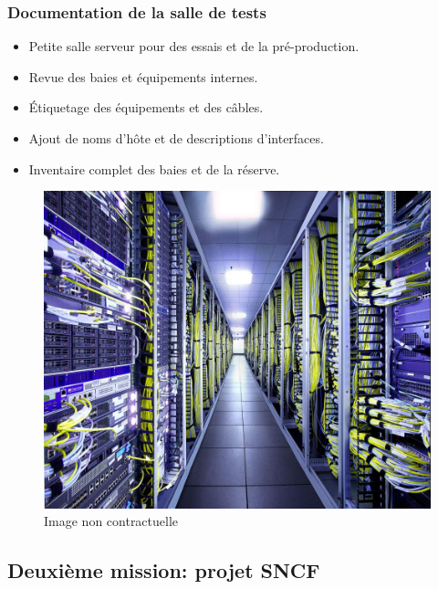 \documentclass[french, a4paper]{beamer}
\begin{document}
\begin{frame}
    \frametitle{Documentation de la salle de tests}
    \begin{minipage}{0.5\textwidth}
        \begin{itemize}
            \item Petite salle serveur pour des essais et de la pré-production.
            \item Revue des baies et équipements internes.
            \item Étiquetage des équipements et des câbles.
            \item Ajout de noms d'hôte et de descriptions d'interfaces.
            \item Inventaire complet des baies et de la réserve.
        \end{itemize}
    \end{minipage}%
    \hfill
    \begin{minipage}{0.45\textwidth}
        \begin{figure}[h!]
            \centering
            \includegraphics[width = \linewidth]{img/misc/data-center.jpg}
            \caption{Image non contractuelle}%
            \label{fig:misc/data-center}
        \end{figure}
    \end{minipage}
\end{frame}

\subsection{Deuxième mission: projet SNCF}
\end{document}
